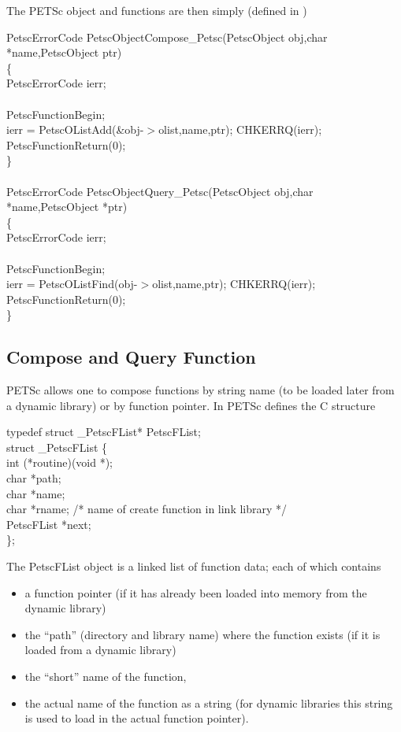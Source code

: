 \documentclass[twoside,12pt]{../sty/report_petsc}
\begin{document}
The PETSc object  and  functions are then simply
(defined in )
\begin{tabbing}
  PetscErrorCode PetscObjectCompose\_Petsc(PetscObject obj,char *name,PetscObject ptr)\\
  \{\\
    PetscErrorCode ierr;\\
\\
    PetscFunctionBegin;\\
    ierr = PetscOListAdd(\&obj-$>$olist,name,ptr); CHKERRQ(ierr);\\
    PetscFunctionReturn(0);\\
  \}\\
\\
  PetscErrorCode PetscObjectQuery\_Petsc(PetscObject obj,char *name,PetscObject *ptr)\\
  \{\\
    PetscErrorCode ierr;\\
\\
    PetscFunctionBegin;\\
    ierr = PetscOListFind(obj-$>$olist,name,ptr); CHKERRQ(ierr);\\
    PetscFunctionReturn(0); \\
  \}
\end{tabbing}

\subsection{Compose and Query Function}

PETSc allows one to compose functions by string name (to be loaded later from 
a dynamic library) or by function pointer. In 
PETSc defines the C structure

\begin{tabbing}
typedef struct \_PetscFList* PetscFList;\\
struct \_PetscFList \{\\
  int    (*routine)(void *);\\
  char   *path;\\
  char   *name;  \\             
  char   *rname;            /* name of create function in link library */\\
  PetscFList  *next;\\
\};
\end{tabbing}

The PetscFList object is a linked list of function data; each 
of which contains
\begin{itemize}
\item a function pointer (if it has already been loaded into memory from the dynamic library)
\item the ``path'' (directory and library name) where the function exists (if it is 
      loaded from a dynamic library)
\item the ``short'' name of the function,
\item the actual name of the function as a string (for dynamic libraries this string is used
      to load in the actual function pointer).
\end{itemize}
\end{document}
